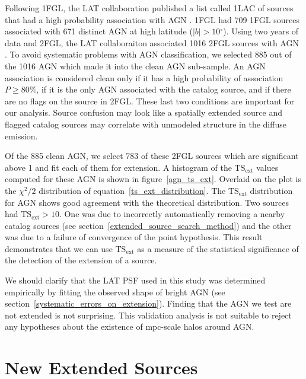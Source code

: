 \documentclass[12pt,preprint]{aastex}
\newcommand{\gev}{\text{GeV}\xspace}
\newcommand{\tsext}{{\ensuremath{\text{TS}_{\text{ext}}}}\xspace}
\renewcommand{\deg}{\ensuremath{^\circ}\xspace}
\begin{document}
Following 1FGL, the LAT collaboration published a list called 1LAC
of sources that
had a high probability association with AGN \citep{first_agn_cat}.
1FGL had 709 1FGL sources associated with 671 distinct AGN at high
latitude ($|b|>10\deg$).  
Using two years of data and 2FGL, the LAT collaboraiton
associated 1016 2FGL sources
with AGN \citep{second_agn_cat}.
To avoid systematic problems with AGN classification, we
selected 885 out of the 1016 AGN which made it into the clean AGN sub-sample.  An AGN
association is considered clean only if it has a high probability
of association $P\ge 80\%$, if it is the only AGN associated with the
catalog source, and if there are no flags on the source in 2FGL. These
last two conditions are important for our analysis. Source
confusion may look like a spatially extended source and flagged catalog
sources may correlate with unmodeled structure in the diffuse emission.

Of the 885 clean AGN, we select 783 of these 2FGL sources which
are significant above 1 \gev and fit each of them for extension.
A histogram of the \tsext values computed for these AGN is
shown in figure~\ref{agn_ts_ext}. Overlaid on the plot is the
$\chi^2/2$ distribution of equation~\ref{ts_ext_distribution}.
The \tsext distribution for AGN shows good agreement with the
theoretical distribution.  Two sources had $\tsext>10$.  One was due
to incorrectly automatically removing a nearby catalog sources (see
section~\ref{extended_source_search_method}) and the other was due to a
failure of convergence of the point hypothesis.  This result demonstrates
that we can use \tsext as a measure of the statistical significance of
the detection of the extension of a source.

We should clarify that the LAT PSF used in this study was determined
empirically by fitting the observed shape of bright AGN (see
section~\ref{systematic_errors_on_extension}). Finding that the AGN we
test are not extended is not surprising.  This validation analysis is
not suitable to reject any hypotheses about the existence of mpc-scale
halos around AGN.

\section{New Extended Sources}
\label{new_ext_srcs_section}

\end{document}
